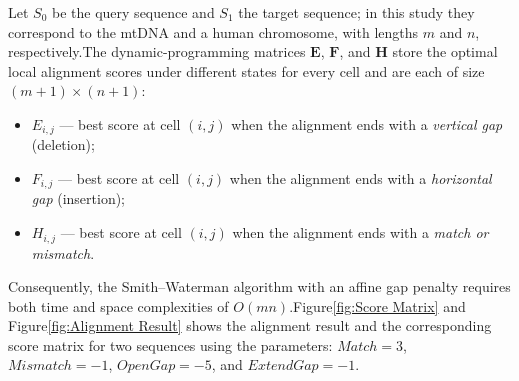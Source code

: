 \documentclass[PhD]{PHlab-thesis}
\begin{document}
Let $S_{0}$ be the query sequence and $S_{1}$ the target sequence;  
in this study they correspond to the mtDNA and a human chromosome,  
with lengths $m$ and $n$, respectively.The dynamic-programming matrices $\mathbf{E}$, $\mathbf{F}$, and $\mathbf{H}$  
store the optimal local alignment scores under different states for every cell and are each of size $(m+1)\times(n+1)$:
\begin{itemize}
  \item $E_{i,j}$ — best score at cell $(i,j)$ when the alignment ends with a
        \emph{vertical gap} (deletion);
  \item $F_{i,j}$ — best score at cell $(i,j)$ when the alignment ends with a
        \emph{horizontal gap} (insertion);
  \item $H_{i,j}$ — best score at cell $(i,j)$ when the alignment ends with a
        \emph{match or mismatch}.
\end{itemize}

\noindent
Consequently, the Smith--Waterman algorithm with an affine gap penalty requires both time and space complexities of $O(mn)$.Figure\ref{fig:Score Matrix} and Figure\ref{fig:Alignment Result} shows the alignment result and the corresponding score matrix for two sequences using the parameters: $Match = 3$, $Mismatch = -1$, $OpenGap = -5$, and $ExtendGap = -1$.
\end{document}
